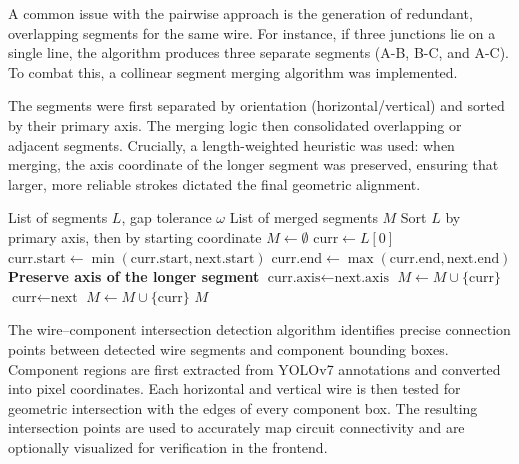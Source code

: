 A common issue with the pairwise approach is the generation of redundant, overlapping segments for the same wire. For instance, if three junctions lie on a single line, the algorithm produces three separate segments (A-B, B-C, and A-C). To combat this, a collinear segment merging algorithm was implemented.

The segments were first separated by orientation (horizontal/vertical) and sorted by their primary axis. The merging logic then consolidated overlapping or adjacent segments. Crucially, a length-weighted heuristic was used: when merging, the axis coordinate of the longer segment was preserved, ensuring that larger, more reliable strokes dictated the final geometric alignment.

\begin{algorithm}
\caption{Collinear Segment Merging}
\label{algo:segment-merging}
\begin{algorithmic}
\Require List of segments $L$, gap tolerance $\omega$
\Ensure List of merged segments $M$
\State Sort $L$ by primary axis, then by starting coordinate
\State $M \leftarrow \emptyset$
\State $\text{curr} \leftarrow L[0]$
        \State $\text{curr.start} \leftarrow \min(\text{curr.start}, \text{next.start})$
        \State $\text{curr.end} \leftarrow \max(\text{curr.end}, \text{next.end})$
            \State \textbf{Preserve axis of the longer segment}
            \State $\text{curr.axis} \leftarrow \text{next.axis}$
        \EndIf
    \Else
        \State $M \leftarrow M \cup \{\text{curr}\}$
        \State $\text{curr} \leftarrow \text{next}$
    \EndIf
\EndFor
\State $M \leftarrow M \cup \{\text{curr}\}$
\State \Return $M$
\end{algorithmic}
\end{algorithm}

The wire–component intersection detection algorithm identifies precise connection points between detected wire segments and component bounding boxes. Component regions are first extracted from YOLOv7 annotations and converted into pixel coordinates. Each horizontal and vertical wire is then tested for geometric intersection with the edges of every component box. The resulting intersection points are used to accurately map circuit connectivity and are optionally visualized for verification in the frontend.

